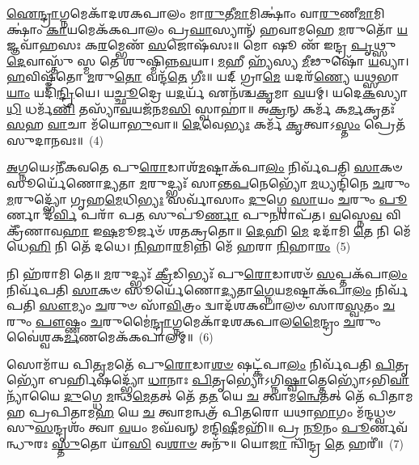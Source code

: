 {\anuvakamend[{\-\ul{𑌆}\-\-\ul{𑌗𑍍𑌨𑍇}\-𑌯\-\ul{𑌮}\-𑌷𑍍𑌟𑌾𑌦᳴𑌶}]}%

\-\ul{𑌐}\-\-\ul{𑌨𑍍𑌦𑍍𑌰𑌾}\-𑌗𑍍𑌨𑌮𑍇𑌕𑌾᳴\-𑌦𑌶\-𑌕𑌪𑌾𑌲𑌂 𑌮𑌾\-\ul{𑌰𑍁}\-𑌤𑍀\-\ul{𑌮𑌾}\-𑌮𑌿𑌕𑍍𑌷𑌾𑌂॑ 𑌵𑌾\-\ul{𑌰𑍁}\-𑌣𑍀\-\ul{𑌮𑌾}\-𑌮𑌿𑌕𑍍𑌷𑌾𑌂॑ \ul{𑌕𑌾}\-𑌯𑌮𑍇𑌕᳴𑌕𑌪𑌾𑌲𑌂 𑌪𑍍𑌰\-\ul{𑌘𑌾}\-𑌸𑍍𑌯𑌾𑌨𑍍᳴ 𑌹𑌵𑌾𑌮𑌹𑍇 \ul{𑌮}\-𑌰𑍁𑌤𑍋᳴ \ul{𑌯}\-𑌜𑍍𑌞𑌵𑌾᳴𑌹𑌸𑌃 𑌕\-\ul{𑌰}\-𑌮𑍍𑌭𑍇𑌣᳴ \ul{𑌸}\-𑌜𑍋𑌷᳴𑌸𑌃॥ 𑌮𑍋 𑌷𑍂 𑌣᳴ 𑌇𑌨𑍍𑌦𑍍𑌰 \ul{𑌪𑍃}\-𑌥𑍍𑌸𑍁 \ul{𑌦𑍇}\-𑌵𑌾𑌸𑍍𑌤𑍁᳴ 𑌸𑍍𑌮 𑌤𑍇 𑌶𑍁𑌷𑍍𑌮𑌿𑌨𑍍𑌨\-\ul{𑌵}\-𑌯𑌾। \ul{𑌮}\-𑌹𑍀 𑌹𑍍𑌯᳴𑌸𑍍𑌯 \ul{𑌮𑍀}\-𑌢𑍁𑌷𑍋᳴ \ul{𑌯}\-𑌵𑍍𑌯𑌾। \ul{𑌹}\-𑌵𑌿𑌷𑍍𑌮᳴𑌤𑍋 \ul{𑌮}\-𑌰𑍁\-\ul{𑌤𑍋} 𑌵𑌨𑍍𑌦᳴\-\ul{𑌤𑍇} 𑌗𑍀𑌃॥ 𑌯𑌦𑍍 𑌗𑍍𑌰𑌾\-\ul{𑌮𑍇} 𑌯𑌦𑌰᳴\-\ul{𑌣𑍍𑌯𑍇} 𑌯\-\ul{𑌥𑍍𑌸}\-𑌭𑌾\-\ul{𑌯𑌾𑌂} 𑌯𑌦𑌿᳴\-\ul{𑌨𑍍𑌦𑍍𑌰𑌿}\-𑌯𑍇। 𑌯\-\ul{𑌚𑍍𑌛𑍂}\-𑌦𑍍𑌰𑍇 𑌯\-\ul{𑌦}\-𑌰𑍍𑌯᳴ 𑌏𑌨᳴𑌶𑍍𑌚\-\ul{𑌕𑍃}\-𑌮𑌾 \ul{𑌵}\-𑌯𑌮𑍍। 𑌯𑌦𑍇\-\ul{𑌕}\-𑌸𑍍𑌯𑌾\-\ul{𑌧𑌿} 𑌧𑌰𑍍𑌮᳴\-\ul{𑌣𑌿} 𑌤𑌸𑍍𑌯𑌾᳴\-\ul{𑌵}\-𑌯𑌜᳴𑌨𑌮\-\ul{𑌸𑌿} 𑌸𑍍𑌵𑌾𑌹𑌾॑॥ 𑌅\-\ul{𑌕𑍍𑌰}\-𑌨𑍍 𑌕𑌰𑍍𑌮᳴ 𑌕\-\ul{𑌰𑍍𑌮}\-𑌕𑍃𑌤𑌃᳴ \ul{𑌸}\-𑌹 \ul{𑌵𑌾}\-𑌚𑌾 𑌮᳴𑌯𑍋\-\ul{𑌭𑍁}\-𑌵𑌾॥ \ul{𑌦𑍇}\-𑌵𑍇\-\ul{𑌭𑍍𑌯𑌃} 𑌕𑌰𑍍𑌮᳴ \ul{𑌕𑍃}\-𑌤𑍍𑌵𑌾\-𑌽\-\ul{𑌸𑍍𑌤𑌂} 𑌪𑍍𑌰𑍇𑌤᳴ 𑌸𑍁𑌦𑌾𑌨𑌵𑌃॥~(4)

{\anuvakamend[{\-\ul{𑌵}\-𑌯𑌂 𑌯𑌦𑍍 𑌵𑌿𑍞᳴\-\ul{𑌶}\-𑌤𑌿𑌶𑍍𑌚᳴}]}%

\-\ul{𑌅}\-𑌗𑍍𑌨𑌯𑍇\-𑌽𑌨𑍀᳴𑌕𑌵𑌤𑍇 𑌪𑍁\-\ul{𑌰𑍋}\-𑌡𑌾𑌶᳴\-\-\ul{𑌮}\-𑌷𑍍𑌟𑌾\-𑌕᳴𑌪𑌾\-\ul{𑌲𑌂} 𑌨𑌿𑌰𑍍𑌵᳴𑌪𑌤𑌿 \ul{𑌸𑌾}\-𑌕𑍞 𑌸𑍂𑌰𑍍𑌯𑍇᳴𑌣𑍋\-\ul{𑌦𑍍𑌯}\-𑌤𑌾 \ul{𑌮}\-𑌰𑍁𑌦𑍍𑌭𑍍𑌯𑌃᳴ 𑌸𑌾𑌨𑍍𑌤\-\ul{𑌪}\-𑌨𑍇𑌭𑍍𑌯𑍋᳴ \ul{𑌮}\-𑌧𑍍𑌯𑌨𑍍𑌦𑌿᳴𑌨𑍇 \ul{𑌚}\-𑌰𑍁𑌂 \ul{𑌮}\-𑌰𑍁𑌦𑍍𑌭𑍍𑌯𑍋᳴ 𑌗𑍃𑌹\-\ul{𑌮𑍇}\-𑌧𑌿\-\ul{𑌭𑍍𑌯𑌃} 𑌸𑌰𑍍𑌵𑌾᳴𑌸𑌾𑌂 \ul{𑌦𑍁}\-𑌗𑍍𑌧𑍇 \ul{𑌸𑌾}\-𑌯𑌂 \ul{𑌚}\-𑌰𑍁𑌂 \ul{𑌪𑍂}\-𑌰𑍍𑌣𑌾 𑌦᳴\-\ul{𑌰𑍍𑌵𑌿} 𑌪𑌰𑌾᳴ 𑌪\-\ul{𑌤} 𑌸𑍁𑌪𑍂॑\-\ul{𑌰𑍍𑌣𑌾} 𑌪𑍁\-\ul{𑌨}\-𑌰𑌾𑌪᳴𑌤। \ul{𑌵}\-𑌸𑍍𑌨𑍇\-\ul{𑌵} 𑌵𑌿 𑌕𑍍𑌰𑍀᳴𑌣𑌾𑌵\-\ul{𑌹𑌾} 𑌇\-\ul{𑌷}\-𑌮𑍂𑌰𑍍𑌜𑍞᳴ 𑌶𑌤𑌕𑍍𑌰𑌤𑍋॥ \ul{𑌦𑍇}\-𑌹𑌿 \ul{𑌮𑍇} 𑌦𑌦𑌾᳴𑌮𑌿 \ul{𑌤𑍇} 𑌨𑌿 𑌮𑍇᳴ 𑌧𑍇\-\ul{𑌹𑌿} 𑌨𑌿 𑌤𑍇᳴ 𑌦𑌧𑍇। \ul{𑌨𑌿}\-𑌹𑌾\-\ul{𑌰}\-𑌮𑌿𑌨𑍍𑌨𑌿 𑌮𑍇᳴ 𑌹𑌰𑌾 \ul{𑌨𑌿}\-𑌹𑌾\-\ul{𑌰𑌂}\-~(5)


𑌨𑌿 𑌹᳴𑌰𑌾𑌮𑌿 𑌤𑍇॥ \ul{𑌮}\-𑌰𑍁𑌦𑍍𑌭𑍍𑌯𑌃᳴ \ul{𑌕𑍍𑌰𑍀}\-𑌡𑌿𑌭𑍍𑌯𑌃᳴ 𑌪𑍁\-\ul{𑌰𑍋}\-𑌡𑌾𑌶𑍞᳴ \ul{𑌸}\-𑌪𑍍𑌤\-𑌕᳴𑌪𑌾\-\ul{𑌲𑌂} 𑌨𑌿𑌰𑍍𑌵᳴𑌪𑌤𑌿 \ul{𑌸𑌾}\-𑌕𑍞 𑌸𑍂𑌰𑍍𑌯𑍇᳴𑌣𑍋\-\ul{𑌦𑍍𑌯}\-𑌤𑌾\-\ul{𑌗𑍍𑌨𑍇}\-𑌯\-\ul{𑌮}\-𑌷𑍍𑌟𑌾\-𑌕᳴𑌪𑌾\-\ul{𑌲𑌂} 𑌨𑌿𑌰𑍍𑌵᳴𑌪𑌤𑌿 \ul{𑌸𑍗}\-𑌮𑍍𑌯𑌂 \ul{𑌚}\-𑌰𑍁𑍞 𑌸𑌾᳴\-\ul{𑌵𑌿}\-𑌤𑍍𑌰𑌂 𑌦𑍍𑌵𑌾𑌦᳴𑌶\-𑌕𑌪𑌾𑌲𑍞 𑌸𑌾𑌰\-\ul{𑌸𑍍𑌵}\-𑌤𑌂 \ul{𑌚}\-𑌰𑍁𑌂 \ul{𑌪𑍗}\-𑌷𑍍𑌣𑌂 \ul{𑌚}\-𑌰𑍁𑌮𑍈॑\-\ul{𑌨𑍍𑌦𑍍𑌰𑌾}\-𑌗𑍍𑌨𑌮𑍇𑌕𑌾᳴\-𑌦𑌶\-𑌕𑌪𑌾𑌲\-\ul{𑌮𑍈}\-𑌨𑍍𑌦𑍍𑌰𑌂 \ul{𑌚}\-𑌰𑍁𑌂 𑌵𑍈॑𑌶𑍍𑌵𑌕\-\ul{𑌰𑍍𑌮}\-𑌣𑌮𑍇𑌕᳴𑌕𑌪𑌾𑌲𑌮𑍍॥~(6)

{\anuvakamend[{\-\ul{𑌹}\-\-\ul{𑌰𑌾} \ul{𑌨𑌿}\-𑌹𑌾𑌰𑌂᳴ \ul{𑌤𑍍𑌰𑌿}\-\-\ul{𑍞}\-𑌶𑌚𑍍𑌚᳴}]}%

𑌸𑍋𑌮𑌾᳴𑌯 𑌪𑌿\-\ul{𑌤𑍃}\-𑌮𑌤𑍇᳴ 𑌪𑍁\-\ul{𑌰𑍋}\-𑌡𑌾\-\ul{𑌶}\-\-\ul{𑍞} 𑌷𑌟𑍍\-𑌕᳴𑌪𑌾\-\ul{𑌲𑌂} 𑌨𑌿𑌰𑍍𑌵᳴𑌪𑌤𑌿 \ul{𑌪𑌿}\-𑌤𑍃𑌭𑍍𑌯𑍋᳴ 𑌬𑌰𑍍\mbox{}\-\ul{𑌹𑌿}\-𑌷𑌦𑍍𑌭𑍍𑌯𑍋᳴ \ul{𑌧𑌾}\-𑌨𑌾𑌃 \ul{𑌪𑌿}\-𑌤𑍃𑌭𑍍𑌯𑍋॑\-𑌽𑌗𑍍𑌨𑌿\-\ul{𑌷𑍍𑌵𑌾}\-𑌤𑍍𑌤𑍇𑌭𑍍𑌯𑍋᳴\-𑌽𑌭𑌿\-\ul{𑌵𑌾}\-𑌨𑍍𑌯𑌾᳴𑌯𑍈 \ul{𑌦𑍁}\-𑌗𑍍𑌧𑍇 \ul{𑌮}\-𑌨𑍍𑌥\-\ul{𑌮𑍇}\-𑌤𑌤𑍍 𑌤𑍇᳴ 𑌤\-\ul{𑌤} 𑌯𑍇 \ul{𑌚} 𑌤𑍍𑌵𑌾𑌮\-\ul{𑌨𑍍𑌵𑍇}\-𑌤𑌤𑍍 𑌤𑍇᳴ 𑌪𑌿𑌤𑌾𑌮𑌹 𑌪𑍍𑌰𑌪𑌿𑌤𑌾𑌮\-\ul{𑌹} 𑌯𑍇 \ul{𑌚} 𑌤𑍍𑌵𑌾𑌮𑌨𑍍𑌵𑌤𑍍𑌰᳴ 𑌪𑌿𑌤𑌰𑍋 𑌯𑌥𑌾\-\ul{𑌭𑌾}\-𑌗𑌂 𑌮᳴𑌨𑍍𑌦𑌧𑍍𑌵𑍞 𑌸𑍁\-\ul{𑌸}\-𑌨𑍍𑌦𑍃𑌶𑌂᳴ 𑌤𑍍𑌵𑌾 \ul{𑌵}\-𑌯𑌂 𑌮𑌘᳴𑌵𑌨𑍍 𑌮𑌨𑍍𑌦𑌿\-\ul{𑌷𑍀}\-𑌮𑌹𑌿᳴॥ 𑌪𑍍𑌰 \ul{𑌨𑍂}\-𑌨𑌂 \ul{𑌪𑍂}\-𑌰𑍍𑌣𑌵᳴𑌨𑍍𑌧𑍁𑌰𑌃 \ul{𑌸𑍍𑌤𑍁}\-𑌤𑍋 𑌯𑌾᳴\-\ul{𑌸𑌿} 𑌵\-\ul{𑌶𑌾}\-\-\ul{𑍞} 𑌅𑌨𑍁᳴॥ 𑌯𑍋\-\ul{𑌜𑌾} 𑌨𑍍𑌵𑌿᳴𑌨𑍍𑌦𑍍𑌰 \ul{𑌤𑍇} 𑌹𑌰𑍀॑॥~(7)

